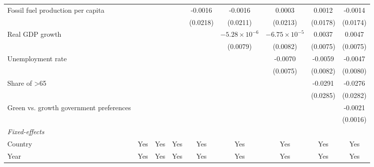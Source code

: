 \begin{table}[htbp]
\begin{tabular}{lcccccccc}
      Fossil fuel production per capita       &                &               &          & -0.0016  & -0.0016                & 0.0003                 & 0.0012   & -0.0014\\   
                                              &                &               &          & (0.0218) & (0.0211)               & (0.0213)               & (0.0178) & (0.0174)\\   
      Real GDP growth                         &                &               &          &          & $-5.28\times 10^{-6}$  & $-6.75\times 10^{-5}$  & 0.0037   & 0.0047\\   
                                              &                &               &          &          & (0.0079)               & (0.0082)               & (0.0075) & (0.0075)\\   
      Unemployment rate                       &                &               &          &          &                        & -0.0070                & -0.0059  & -0.0047\\   
                                              &                &               &          &          &                        & (0.0075)               & (0.0082) & (0.0080)\\   
      Share of >65                            &                &               &          &          &                        &                        & -0.0291  & -0.0276\\   
                                              &                &               &          &          &                        &                        & (0.0285) & (0.0282)\\   
      Green vs. growth government preferences &                &               &          &          &                        &                        &          & -0.0021\\   
                                              &                &               &          &          &                        &                        &          & (0.0016)\\   
      \midrule
      \emph{Fixed-effects}\\
      Country                                 & Yes            & Yes           & Yes      & Yes      & Yes                    & Yes                    & Yes      & Yes\\  
      Year                                    & Yes            & Yes           & Yes      & Yes      & Yes                    & Yes                    & Yes      & Yes\\  

\end{tabular}
\end{table}
